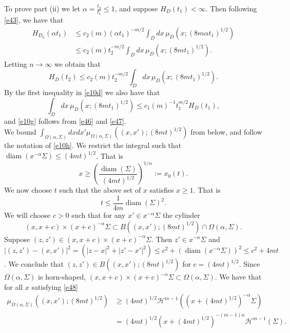 \documentclass[a4paper,9pt]{amsart}
\begin{document}
To prove part (ii) we let $\alpha=\frac{t_2}{t_1}\le 1$, and
suppose $H_D(t_1)<\infty$. Then following \eqref{e43}, we have
that
\begin{align*}
H_{D_n}(\alpha t_1)& \le c_2(m)(\alpha
t_1)^{-m/2}\int_{D}dx \, \mu_{D}(x;(8m\alpha t_1)^{1/2})\\ &
\le c_2(m)t_2^{-m/2}\int_{D}dx \, \mu_{D}(x;(8m t_1)^{1/2}).
\end{align*}
Letting $n\rightarrow \infty$ we obtain that
\begin{equation}\label{e46}
H_{D}(t_2) \le c_2(m)t_2^{-m/2}\int_{D}dx \, \mu_{D}(x;(8m
t_1)^{1/2}).
\end{equation}
By the first inequality in \eqref{e10d} we also have that
\begin{equation}\label{e47}
\int_{D}dx \, \mu_{D}(x;(8m t_1)^{1/2})\le
c_1(m)^{-1}t_1^{m/2}H_D(t_1),
\end{equation}
and \eqref{e10g} follows from \eqref{e46} and \eqref{e47}.
\\[5pt]
We bound
$\int_{\Omega(\alpha,\Sigma)}dxdx'\mu_{\Omega(\alpha,\Sigma)}((x,x');(8mt)^{1/2})$
from below, and follow the notation of \eqref{e10h}. We restrict
the integral such that $\operatorname{diam}(x^{-\alpha} \Sigma)\le (4mt)^{1/2}$.
That is
\begin{equation}\label{e48}
x\ge \left(\frac{\operatorname{diam}
(\Sigma)}{(4mt)^{1/2}}\right)^{1/\alpha}:=x_0(t).
\end{equation}
We now choose $t$ such that the above set of $x$ satisfies $x\ge
1$. That is
\begin{equation*}
t \le \frac{1}{4m}\operatorname{diam}(\Sigma)^2.
\end{equation*}
We will choose $c>0$ such that for any $x' \in x^{-\alpha}\Sigma$
the cylinder
\begin{equation*}
(x,x+c)\times(x+c)^{-\alpha}\Sigma \subset
B((x,x');(8mt)^{1/2})\cap \Omega(\alpha,\Sigma).
\end{equation*}
Suppose $(z,z')\in (x,x+c)\times(x+c)^{-\alpha}\Sigma$. Then
$z'\in x^{-\alpha}\Sigma$ and
$|(z,z')-(x,x')|^2=(|z-x|^2+|z'-x'|^2)\le c^2+
(\operatorname{diam}(x^{-\alpha}\Sigma))^2\le c^2+4mt$. We conclude that
$(z,z')\in B((x,x');(8mt)^{1/2})$ for $c=(4mt)^{1/2}$.  Since
$\Omega(\alpha,\Sigma)$ is horn-shaped,
$(x,x+c)\times(x+c)^{-\alpha}\Sigma \subset
\Omega(\alpha,\Sigma)$. We have that for all $x$ satisfying
\eqref{e48}
\begin{align*}
\mu_{\Omega(\alpha,\Sigma)}((x,x');(8mt)^{1/2})&\ge
(4mt)^{1/2}\mathcal{H}^{m-1}((x+(4mt)^{1/2})^{-\alpha}\Sigma)\\
&=
(4mt)^{1/2}(x+(4mt)^{1/2})^{-(m-1)\alpha}\mathcal{H}^{m-1}(\Sigma).
\end{align*}
\end{document}
